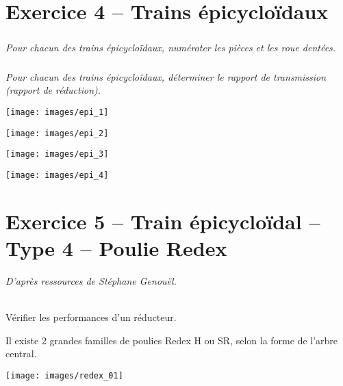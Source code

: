 \documentclass[10pt,fleqn]{article} %
\begin{document}
\begin{multicols}{2}
\section*{Exercice 4 -- Trains épicycloïdaux}
\setcounter{exo}{0}
\subparagraph{}
\textit{Pour chacun des trains épicycloïdaux, numéroter les pièces et les roue dentées.}

\subparagraph{}
\textit{Pour chacun des trains épicycloïdaux, déterminer le rapport de transmission (rapport de réduction).}

\begin{center}
 \texttt{[image: images/epi\_1]}
\end{center}

\begin{center}
 \texttt{[image: images/epi\_2]}
\end{center}

\begin{center}
 \texttt{[image: images/epi\_3]}
\end{center}

\begin{center}
 \texttt{[image: images/epi\_4]}
\end{center}


%

\section*{Exercice 5 -- Train épicycloïdal -- Type 4 -- Poulie Redex}
\setcounter{exo}{0}

\textit{D'après ressources de Stéphane Genouël.}


\begin{obj}~\\
Vérifier les performances d'un réducteur.
\end{obj}

Il existe 2 grandes familles de poulies Redex H ou SR, selon la forme de l’arbre central.


\begin{center}
\texttt{[image: images/redex\_01]}
\end{center}




\end{multicols}
\end{document}
